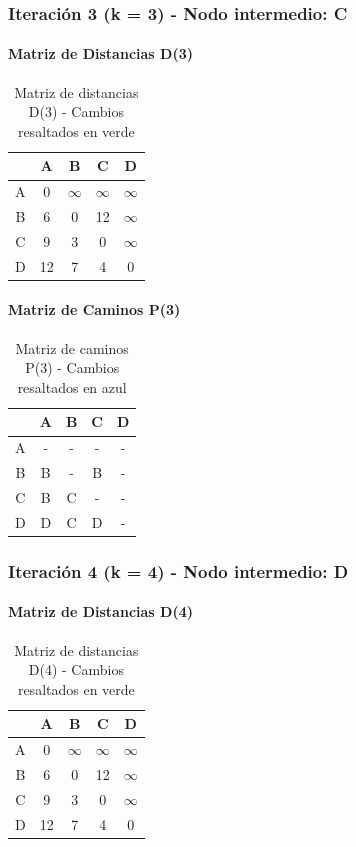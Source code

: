 \documentclass[12pt]{article}
\begin{document}
\subsubsection{Iteración 3 (k = 3) - Nodo intermedio: C}
\paragraph{Matriz de Distancias D(3)}
\begin{table}[h!]
\centering
\begin{tabular}{|c|c|c|c|c|}
\hline
 & A & B & C & D \\\hline
A & 0 & $\infty$ & $\infty$ & $\infty$ \\\hline
B & 6 & 0 & 12 & $\infty$ \\\hline
C & 9 & 3 & 0 & $\infty$ \\\hline
D & 12 & \cellcolor{lightgreen} 7 & 4 & 0 \\\hline
\end{tabular}
\caption{Matriz de distancias D(3) - Cambios resaltados en verde}
\end{table}

\paragraph{Matriz de Caminos P(3)}
\begin{table}[h!]
\centering
\begin{tabular}{|c|c|c|c|c|}
\hline
 & A & B & C & D \\\hline
A & - & - & - & - \\\hline
B & B & - & B & - \\\hline
C & B & C & - & - \\\hline
D & D & \cellcolor{lightblue} C & D & - \\\hline
\end{tabular}
\caption{Matriz de caminos P(3) - Cambios resaltados en azul}
\end{table}

\subsubsection{Iteración 4 (k = 4) - Nodo intermedio: D}
\paragraph{Matriz de Distancias D(4)}
\begin{table}[h!]
\centering
\begin{tabular}{|c|c|c|c|c|}
\hline
 & A & B & C & D \\\hline
A & 0 & $\infty$ & $\infty$ & $\infty$ \\\hline
B & 6 & 0 & 12 & $\infty$ \\\hline
C & 9 & 3 & 0 & $\infty$ \\\hline
D & 12 & 7 & 4 & 0 \\\hline
\end{tabular}
\caption{Matriz de distancias D(4) - Cambios resaltados en verde}
\end{table}
\end{document}
